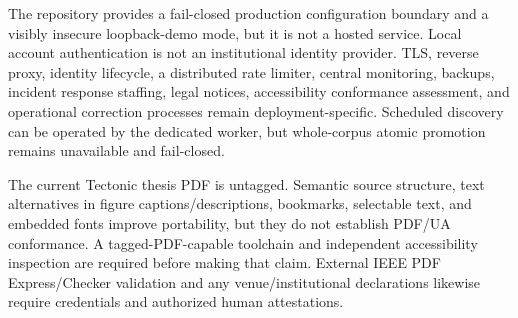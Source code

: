 The repository provides a fail-closed production configuration boundary and a visibly insecure loopback-demo mode, but it is not a hosted service. Local account authentication is not an institutional identity provider. TLS, reverse proxy, identity lifecycle, a distributed rate limiter, central monitoring, backups, incident response staffing, legal notices, accessibility conformance assessment, and operational correction processes remain deployment-specific. Scheduled discovery can be operated by the dedicated worker, but whole-corpus atomic promotion remains unavailable and fail-closed.

The current Tectonic thesis PDF is untagged. Semantic source structure, text alternatives in figure captions/descriptions, bookmarks, selectable text, and embedded fonts improve portability, but they do not establish PDF/UA conformance. A tagged-PDF-capable toolchain and independent accessibility inspection are required before making that claim. External IEEE PDF Express/Checker validation and any venue/institutional declarations likewise require credentials and authorized human attestations.
